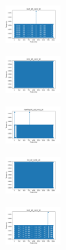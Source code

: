 \begin{figure}[H]
\begin{subfigure}
    \end{subfigure}
    \hfill
    \begin{subfigure}
        \centering
        \includegraphics[width=0.234\textwidth]{img/agesf/ecoli_set_const_10_589741062_time.png}
    \end{subfigure}
    \hfill
    \begin{subfigure}
        \centering
        \includegraphics[width=0.234\textwidth]{img/agesf/rand_set_const_10_589741062_time.png}
    \end{subfigure}
    \hfill
    \begin{subfigure}
        \centering
        \includegraphics[width=0.234\textwidth]{img/agesf/newthyroid_set_const_10_589741062_time.png}
    \end{subfigure}
    \hfill
    \begin{subfigure}
        \centering
        \includegraphics[width=0.234\textwidth]{img/agesf/iris_set_const_10_277451237_time.png}
    \end{subfigure}
    \hfill
    \begin{subfigure}
        \centering
        \includegraphics[width=0.234\textwidth]{img/agesf/ecoli_set_const_10_277451237_time.png}
    \end{subfigure}
    \hfill

\end{figure}
